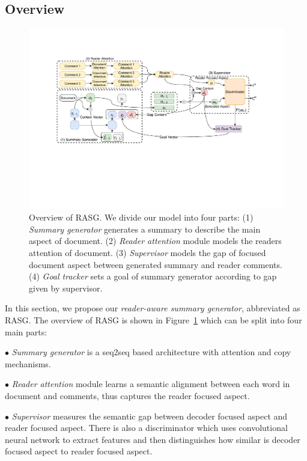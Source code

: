 \documentclass[letterpaper]{article} %
\begin{document}
\subsection{Overview}

\begin{figure}
    \centering
    \includegraphics[scale=0.66]{figs/weibo.pdf}
    \caption{Overview of RASG. We divide our model into four parts: (1) \textit{Summary generator} generates a summary to describe the main aspect of document. (2) \textit{Reader attention} module models the readers attention of document. (3) \textit{Supervisor} models the gap of focused document aspect between generated summary and reader comments. (4) \textit{Goal tracker} sets a goal of summary generator according to gap given by supervisor.
    }
    \label{fig:overview}
\end{figure}

In this section, we propose our \emph{reader-aware summary generator}, abbreviated as RASG.
The overview of RASG is shown in Figure~\ref{fig:overview} which can be split into four main parts:

$\bullet$ \textit{Summary generator} is a seq2seq based architecture with attention and copy mechanisms.

$\bullet$ \textit{Reader attention} module learns a semantic alignment between each word in document and comments, thus captures the reader focused aspect.

$\bullet$ \textit{Supervisor} measures the semantic gap between decoder focused aspect and reader focused aspect.
There is also a discriminator which uses convolutional neural network to extract features and then distinguishes how similar is decoder focused aspect to reader focused aspect.
\end{document}
